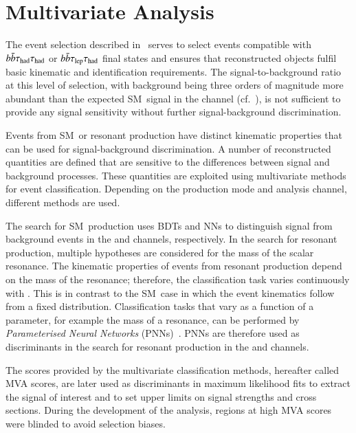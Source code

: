 \section{Multivariate Analysis}%
\label{sec:multivariate_analysis}

The event selection described in~ serves
to select events compatible with $b\bar{b}\tau_{\text{had}}\tau_{\text{had}}$ or $b\bar{b}\tau_{\text{lep}}\tau_{\text{had}}$ final states
and ensures that reconstructed objects fulfil basic kinematic and identification
requirements. The signal-to-background ratio at this level of selection, with
background being three orders of magnitude more abundant than the expected
SM~\HH signal in the \hadhad channel (cf.~), is
not sufficient to provide any signal sensitivity without further
signal-background discrimination.

Events from SM~\HH or resonant \HH production have distinct kinematic properties
that can be used for signal-background discrimination. A number of reconstructed
quantities are defined that are sensitive to the differences between signal and
background processes. These quantities are exploited using multivariate methods
for event classification. Depending on the \HH production mode and analysis
channel, different methods are used.

The search for SM~\HH production uses BDTs and NNs to distinguish signal from
background events in the \hadhad and \lephad channels, respectively. In the
search for resonant \HH production, multiple hypotheses are considered for the
mass of the scalar resonance. The kinematic properties of events from resonant
\HH production depend on the mass of the resonance; therefore, the
classification task varies continuously with \mX. This is in contrast to the
SM~\HH case in which the event kinematics follow from a fixed
distribution. Classification tasks that vary as a function of a parameter, for
example the mass of a resonance, can be performed by \emph{Parameterised Neural
  Networks} (PNNs)~\cite{Baldi:2016fzo}. PNNs are therefore used as
discriminants in the search for resonant \HH production in the \hadhad and
\lephad channels.

The scores provided by the multivariate classification methods, hereafter called
MVA scores, are later used as discriminants in maximum likelihood fits to
extract the signal of interest and to set upper limits on signal strengths and
cross sections.
During the development of the analysis, regions at high MVA scores were blinded
to avoid selection biases.

